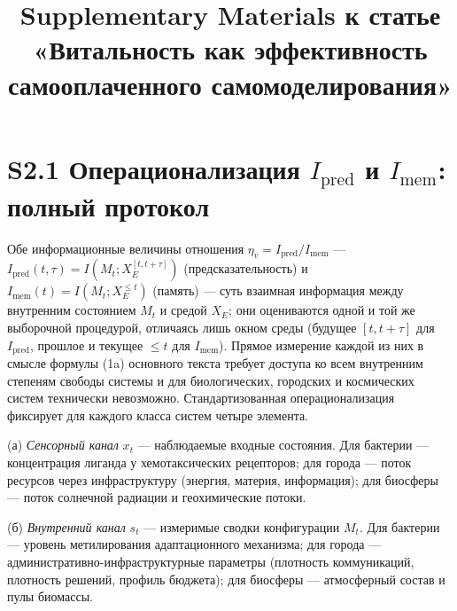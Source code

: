 \documentclass[pdflatex,sn-mathphys-ay]{sn-jnl}
\begin{document}
\title[Дополнительные материалы]{Supplementary Materials к статье «Витальность как эффективность самооплаченного самомоделирования»}

\author*[1]{ }


\maketitle

\section*{\texorpdfstring{S2.1 Операционализация \(I_{\text{pred}}\) и \(I_{\text{mem}}\): полный протокол}{S2.1 Операционализация I\_\{\textbackslash text\{pred\}\} и I\_\{\textbackslash text\{mem\}\}: полный протокол}}\label{s2.1-ux43eux43fux435ux440ux430ux446ux438ux43eux43dux430ux43bux438ux437ux430ux446ux438ux44f-i_textpred-ux438-i_textmem-ux43fux43eux43bux43dux44bux439-ux43fux440ux43eux442ux43eux43aux43eux43b}

Обе информационные величины отношения \(\eta_v = I_{\text{pred}}/I_{\text{mem}}\) --- \(I_{\text{pred}}(t,\tau) = I(M_t; X_E^{[t, t+\tau]})\) (предсказательность) и \(I_{\text{mem}}(t) = I(M_t; X_E^{\le t})\) (память) --- суть взаимная информация между внутренним состоянием \(M_t\) и средой \(X_E\); они оцениваются одной и той же выборочной процедурой, отличаясь лишь окном среды (будущее \([t, t+\tau]\) для \(I_{\text{pred}}\), прошлое и текущее \(\le t\) для \(I_{\text{mem}}\)). Прямое измерение каждой из них в смысле формулы (1a) основного текста требует доступа ко всем внутренним степеням свободы системы и для биологических, городских и космических систем технически невозможно. Стандартизованная операционализация фиксирует для каждого класса систем четыре элемента.

(а) \emph{Сенсорный канал} \(x_t\) --- наблюдаемые входные состояния. Для бактерии --- концентрация лиганда у хемотаксических рецепторов; для города --- поток ресурсов через инфраструктуру (энергия, материя, информация); для биосферы --- поток солнечной радиации и геохимические потоки.

(б) \emph{Внутренний канал} \(s_t\) --- измеримые сводки конфигурации \(M_t\). Для бактерии --- уровень метилирования адаптационного механизма; для города --- административно-инфраструктурные параметры (плотность коммуникаций, плотность решений, профиль бюджета); для биосферы --- атмосферный состав и пулы биомассы.
\end{document}
